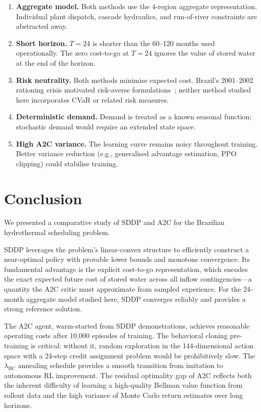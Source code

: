 \documentclass[11pt,letterpaper]{article}
\begin{document}
\begin{enumerate}[noitemsep]
  \item \textbf{Aggregate model.} Both methods use the 4-region aggregate
        representation.  Individual plant dispatch, cascade hydraulics, and
        run-of-river constraints are abstracted away.
  \item \textbf{Short horizon.} $T = 24$ is shorter than the 60--120 months used
        operationally.  The zero cost-to-go at $T = 24$ ignores the value of
        stored water at the end of the horizon.
  \item \textbf{Risk neutrality.} Both methods minimise expected cost.
        Brazil's 2001--2002 rationing crisis motivated risk-averse
        formulations~\citep{shapiro2013}; neither method studied here
        incorporates CVaR or related risk measures.
  \item \textbf{Deterministic demand.} Demand is treated as a known seasonal
        function; stochastic demand would require an extended state space.
  \item \textbf{High A2C variance.} The learning curve remains noisy throughout
        training.  Better variance reduction (e.g., generalised advantage
        estimation, PPO clipping) could stabilise training.
\end{enumerate}

\section{Conclusion}
\label{sec:conclusion}

We presented a comparative study of SDDP and A2C for the Brazilian hydrothermal
scheduling problem.

SDDP leverages the problem's linear-convex structure to efficiently construct a
near-optimal policy with provable lower bounds and monotone convergence.
Its fundamental advantage is the explicit cost-to-go representation, which encodes
the exact expected future cost of stored water across all inflow contingencies---a
quantity the A2C critic must approximate from sampled experience.
For the 24-month aggregate model studied here, SDDP converges reliably and provides
a strong reference solution.

The A2C agent, warm-started from SDDP demonstrations, achieves reasonable operating
costs after 10{,}000 episodes of training.
The behavioral cloning pre-training is critical: without it, random exploration in
the 144-dimensional action space with a 24-step credit assignment problem would be
prohibitively slow.
The $\lambda_{\mathrm{BC}}$ annealing schedule provides a smooth transition from
imitation to autonomous RL improvement.
The residual optimality gap of A2C reflects both the inherent difficulty of learning
a high-quality Bellman value function from rollout data and the high variance of
Monte Carlo return estimates over long horizons.
\end{document}
